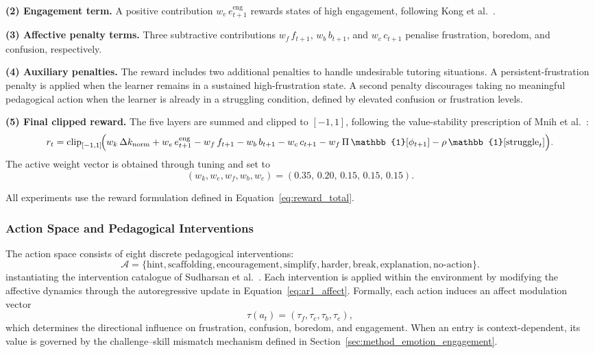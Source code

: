 \textbf{(2) Engagement term.} A positive contribution $w_e\, e^\mathrm{eng}_{t+1}$ rewards states of high engagement, following Kong et al.~\cite{kong_real-time_2025}.

\textbf{(3) Affective penalty terms.} Three subtractive contributions $w_f\, f_{t+1}$, $w_b\, b_{t+1}$, and $w_c\, c_{t+1}$ penalise frustration, boredom, and confusion, respectively.

\textbf{(4) Auxiliary penalties.}
The reward includes two additional penalties to handle undesirable tutoring situations. A persistent-frustration penalty is applied when the learner remains in a sustained high-frustration state. A second penalty discourages taking no meaningful pedagogical action when the learner is already in a struggling condition, defined by elevated confusion or frustration levels.

\textbf{(5) Final clipped reward.} The five layers are summed and clipped to $[-1, 1]$, following the value-stability prescription of Mnih et al.~\cite{mnih_dqn_2015}:
\begin{equation}
    r_t = \mathrm{clip}_{[-1,1]}\!\Bigl(
        w_k\,\Delta k_\mathrm{norm}
        + w_e\, e^\mathrm{eng}_{t+1}
        - w_f\, f_{t+1}
        - w_b\, b_{t+1}
        - w_c\, c_{t+1}
        - w_f\,\Pi\,\mathbb{1}[\phi_{t+1}]
        - \rho\,\mathbb{1}[\mathrm{struggle}_t]
    \Bigr).
    \label{eq:reward_total}
\end{equation}
The active weight vector is obtained through tuning and set to
\[
(w_k, w_e, w_f, w_b, w_c) =
(0.35,\, 0.20,\, 0.15,\, 0.15,\, 0.15).
\]

All experiments use the reward formulation defined in Equation~\eqref{eq:reward_total}.
\subsubsection{Action Space and Pedagogical Interventions}\label{sec:method_action_space}

The action space consists of eight discrete pedagogical interventions:
\[
\mathcal{A} =
\{\text{hint}, \text{scaffolding}, \text{encouragement}, \text{simplify}, \text{harder}, \text{break}, \text{explanation}, \text{no-action}\}.
\]
instantiating the intervention catalogue of Sudharsan et al.~\cite{sudharsan_intervention_2026}.
Each intervention is applied within the environment by modifying the affective dynamics through the autoregressive update in Equation~\eqref{eq:ar1_affect}. Formally, each action induces an affect modulation vector
\[
\tau(a_t) = (\tau_f, \tau_c, \tau_b, \tau_e),
\]
which determines the directional influence on frustration, confusion, boredom, and engagement. When an entry is context-dependent, its value is governed by the challenge--skill mismatch mechanism defined in Section~\ref{sec:method_emotion_engagement}.

